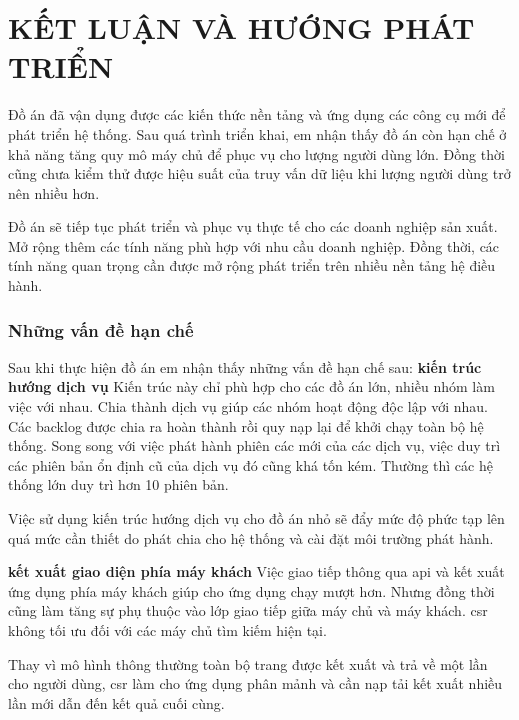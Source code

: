 \fontsize{13px}{13px}\selectfont\justifying

\chapter*{KẾT LUẬN VÀ HƯỚNG PHÁT TRIỂN}
	Đồ án đã vận dụng được các kiến thức nền tảng và ứng dụng các công cụ mới để phát triển hệ thống. Sau quá trình triển khai, em nhận thấy đồ án còn hạn chế ở khả năng tăng quy mô máy chủ để phục vụ cho lượng người dùng lớn. Đồng thời cũng chưa kiểm thử được hiệu suất của truy vấn dữ liệu khi lượng người dùng trở nên nhiều hơn.
	
	Đồ án sẽ tiếp tục phát triển và phục vụ thực tế cho các doanh nghiệp sản xuất. Mở rộng thêm các tính năng phù hợp với nhu cầu doanh nghiệp. Đồng thời, các tính năng quan trọng cần được mở rộng phát triển trên nhiều nền tảng hệ điều hành.
	
	\subsection*{Những vấn đề hạn chế}
	Sau khi thực hiện đồ án em nhận thấy những vấn đề hạn chế sau:
	\textbf{kiến trúc hướng dịch vụ} Kiến trúc này chỉ phù hợp cho các đồ án lớn, nhiều nhóm làm việc với nhau. Chia thành dịch vụ giúp các nhóm hoạt động độc lập với nhau. Các \gls{backlog} được chia ra hoàn thành rồi quy nạp lại để khởi chạy toàn bộ hệ thống. Song song với việc phát hành phiên các mới của các dịch vụ, việc duy trì các phiên bản ổn định cũ của dịch vụ đó cũng khá tốn kém. Thường thì các hệ thống lớn duy trì hơn 10 phiên bản.
	
	Việc sử dụng kiến trúc hướng dịch vụ cho đồ án nhỏ sẽ đẩy mức độ phức tạp lên quá mức cần thiết do phát chia cho hệ thống và cài đặt môi trường phát hành.
	
	\textbf{kết xuất giao diện phía máy khách} Việc giao tiếp thông qua \acrshort{api} và kết xuất ứng dụng phía máy khách giúp cho ứng dụng chạy mượt hơn. Nhưng đồng thời cũng làm tăng sự phụ thuộc vào lớp giao tiếp giữa máy chủ và máy khách.  \acrshort{csr}  không tối ưu đối với các máy chủ tìm kiếm hiện tại.
	
	Thay vì mô hình thông thường toàn bộ trang được kết xuất và trả về một lần cho người dùng,  \acrshort{csr}  làm cho ứng dụng phân mảnh và cần nạp tải kết xuất nhiều lần mới dẫn đến kết quả cuối cùng.
	

